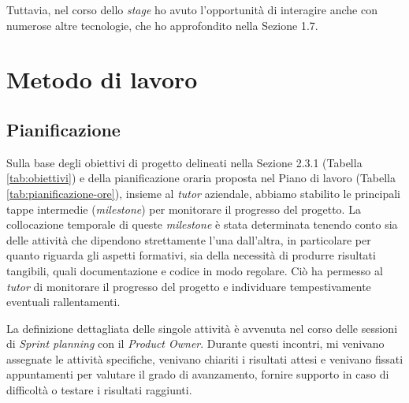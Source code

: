         \noindent Tuttavia, nel corso dello \textit{stage} ho avuto l'opportunità di interagire anche con numerose altre tecnologie, che ho approfondito nella Sezione 1.7.

    \section{Metodo di lavoro}
        \subsection{Pianificazione}
        
        Sulla base degli obiettivi di progetto delineati nella Sezione 2.3.1 (Tabella \ref{tab:obiettivi}) e della pianificazione oraria proposta nel Piano di lavoro (Tabella \ref{tab:pianificazione-ore}), insieme al \textit{tutor} aziendale, abbiamo stabilito le principali tappe intermedie (\textit{milestone}) per monitorare il progresso del progetto. La collocazione temporale di queste \textit{milestone} è stata determinata tenendo conto sia delle attività che dipendono strettamente l'una dall'altra, in particolare per quanto riguarda gli aspetti formativi, sia della necessità di produrre risultati tangibili, quali documentazione e codice in modo regolare. Ciò ha permesso al \textit{tutor} di monitorare il progresso del progetto e individuare tempestivamente eventuali rallentamenti.

        \vspace{0.2 em}
        \noindent La definizione dettagliata delle singole attività è avvenuta nel corso delle sessioni di \textit{Sprint planning} con il \textit{Product Owner}. Durante questi incontri, mi venivano assegnate le attività specifiche, venivano chiariti i risultati attesi e venivano fissati appuntamenti per valutare il grado di avanzamento, fornire supporto in caso di difficoltà o testare i risultati raggiunti. 

        \renewcommand{\arraystretch}{2} %
        \setlength{\tabcolsep}{9pt} %
        
